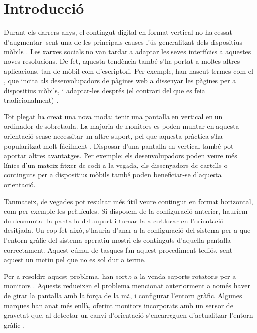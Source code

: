 \chapter{Introducció}
\label{cap:introduccio}

Durant els darrers anys, el contingut digital en format vertical no ha cessat
d'augmentar, sent una de les principals causes l'ús generalitzat dels
dispositius mòbils \cite{Navarro2023El}. Les xarxes socials no van tardar a
adaptar les seves interfícies a aquestes noves resolucions. De fet, aquesta
tendència també s'ha portat a moltes altres aplicacions, tan de mòbil com
d'escriptori. Per exemple, han nascut termes com el
, que incita als desenvolupadors de pàgines web
a dissenyar les pàgines per a dispositius mòbils, i adaptar-les després
(el contrari del que es feia tradicionalment) \cite{varrela2015mobile}.

Tot plegat ha creat una nova moda: tenir una pantalla en vertical
en un ordinador de sobretaula. La majoria de monitors es poden muntar en
aquesta orientació sense necessitar un altre suport, pel que aquesta pràctica
s'ha popularitzat molt fàcilment \cite{WeardenPortrait}.
Disposar d'una pantalla en vertical també pot aportar altres avantatges. Per
exemple: els desenvolupadors poden veure més línies d'un mateix fitxer de codi
a la vegada, els dissenyadors de cartells o continguts per a dispositius mòbils
també poden beneficiar-se d'aquesta orientació.

Tanmateix, de vegades pot resultar més útil veure contingut en format
horizontal, com per exemple les pe\l.lícules. Si disposem de la configuració
anterior, hauríem de desmuntar la pantalla del suport i tornar-la a co\l.locar
en l'orientació desitjada. Un cop fet això, s'hauria d'anar a la configuració
del sistema per a que l'entorn gràfic del sistema operatiu mostri els continguts
d'aquella pantalla correctament. Aquest cúmul de tasques fan aquest procediment
tediós, sent aquest un motiu pel que no es sol dur a terme.

Per a resoldre aquest problema, han sortit a la venda suports rotatoris per a 
monitors \cite{DIGITUSUniversal}. Aquests redueixen el problema mencionat
anteriorment a només haver de girar la pantalla amb la força de la mà, i
configurar l'entorn gràfic. Algunes marques han anat més enllà, oferint
monitors incorporats amb un sensor de gravetat que, al detectar un canvi
d'orientació s'encarreguen d'actualitzar l'entorn gràfic \cite{LCLC}.

